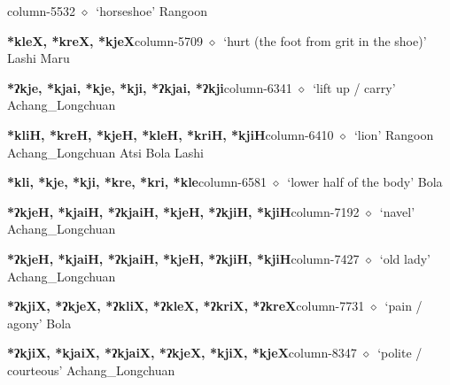   \item {\footnotesize \textbf{}}{\tiny column-5532}
         $\diamond$~`horseshoe'
         Rangoon 
  \item {\footnotesize \textbf{*kleX, *kreX, *kjeX}}{\tiny column-5709}
         $\diamond$~`hurt (the foot from grit in the shoe)'
         Lashi 
\hspace{1ex}
         Maru 
  \item {\footnotesize \textbf{*ʔkje, *kjai, *kje, *kji, *ʔkjai, *ʔkji}}{\tiny column-6341}
         $\diamond$~`lift up / carry'
         Achang\_Longchuan 
  \item {\footnotesize \textbf{*kliH, *kreH, *kjeH, *kleH, *kriH, *kjiH}}{\tiny column-6410}
         $\diamond$~`lion'
         Rangoon 
\hspace{1ex}
         Achang\_Longchuan 
\hspace{1ex}
         Atsi 
\hspace{1ex}
         Bola 
\hspace{1ex}
         Lashi 
  \item {\footnotesize \textbf{*kli, *kje, *kji, *kre, *kri, *kle}}{\tiny column-6581}
         $\diamond$~`lower half of the body'
         Bola 
  \item {\footnotesize \textbf{*ʔkjeH, *kjaiH, *ʔkjaiH, *kjeH, *ʔkjiH, *kjiH}}{\tiny column-7192}
         $\diamond$~`navel'
         Achang\_Longchuan 
  \item {\footnotesize \textbf{*ʔkjeH, *kjaiH, *ʔkjaiH, *kjeH, *ʔkjiH, *kjiH}}{\tiny column-7427}
         $\diamond$~`old lady'
         Achang\_Longchuan 
  \item {\footnotesize \textbf{*ʔkjiX, *ʔkjeX, *ʔkliX, *ʔkleX, *ʔkriX, *ʔkreX}}{\tiny column-7731}
         $\diamond$~`pain / agony'
         Bola 
  \item {\footnotesize \textbf{*ʔkjiX, *kjaiX, *ʔkjaiX, *ʔkjeX, *kjiX, *kjeX}}{\tiny column-8347}
         $\diamond$~`polite / courteous'
         Achang\_Longchuan 
